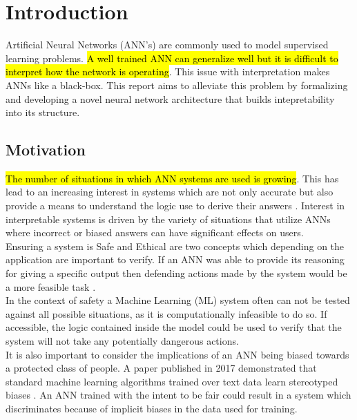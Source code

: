 \chapter{Introduction}\label{C:intro}

Artificial Neural Networks (ANN's) are commonly used to model supervised learning problems. \hl{A well trained ANN can generalize well but it is difficult to interpret how the network is operating}. This issue with interpretation makes ANNs like a black-box. This report aims to alleviate this problem by formalizing and developing a novel neural network architecture that builds intepretability into its structure.

\section{Motivation}
\hl{The number of situations in which ANN systems are used is growing}. This has lead to an increasing interest in systems which are not only accurate but also provide a means to understand the logic use to derive their answers \cite{doshi2017towards}. Interest in interpretable systems is driven by the variety of situations that utilize ANNs where incorrect or biased answers can have significant effects on users.\\

Ensuring a system is Safe and Ethical are two concepts which depending on the application are important to verify. If an ANN was able to provide its reasoning for giving a specific output then defending actions made by the system would be a more feasible task \cite{doshi2017towards}.\\

In the context of safety a Machine Learning (ML) system often can not be tested against all possible situations, as it is computationally infeasible to do so. If accessible, the logic contained inside the model could be used to verify that the system will not take any potentially dangerous actions.\\

It is also important to consider the implications of an ANN being biased towards a protected class of people. A paper published in 2017 demonstrated that standard machine learning algorithms trained over text data learn stereotyped biases \cite{caliskan2017semantics}. An ANN trained with the intent to be fair could result in a system which discriminates because of implicit biases in the data used for training.\\

